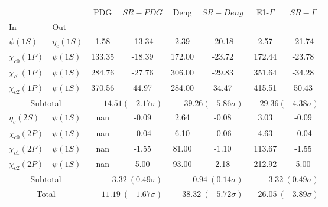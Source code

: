 \begin{tabular}{|l|l|c|c|c|c|c|c|}%
\hline%
&&PDG&$SR-PDG$&Deng&$SR-Deng$&E1-$\Gamma$&$SR-\Gamma$\\%
In&Out&&&&&&\\%
\hline%
$\psi(1S)$&$\eta_{c}(1S)$&1.58&-13.34&2.39&-20.18&2.57&-21.74\\%
$\chi_{c0}(1P)$&$\psi(1S)$&133.35&-18.39&172.00&-23.72&172.44&-23.78\\%
$\chi_{c1}(1P)$&$\psi(1S)$&284.76&-27.76&306.00&-29.83&351.64&-34.28\\%
$\chi_{c2}(1P)$&$\psi(1S)$&370.56&44.97&284.00&34.47&415.51&50.43\\%
\hline%
\hline%
\multicolumn{2}{|c|}{Subtotal}&\multicolumn{2}{|r|}{$-14.51 (-2.17\sigma)$}&\multicolumn{2}{|r|}{$-39.26 (-5.86\sigma)$}&\multicolumn{2}{|r|}{$-29.36 (-4.38\sigma)$}\\%
\hline%
\hline%
$\eta_{c}(2S)$&$\psi(1S)$&nan&-0.09&2.64&-0.08&3.03&-0.09\\%
$\chi_{c0}(2P)$&$\psi(1S)$&nan&-0.04&6.10&-0.06&4.63&-0.04\\%
$\chi_{c1}(2P)$&$\psi(1S)$&nan&-1.55&81.00&-1.10&113.67&-1.55\\%
$\chi_{c2}(2P)$&$\psi(1S)$&nan&5.00&93.00&2.18&212.92&5.00\\%
\hline%
\hline%
\multicolumn{2}{|c|}{Subtotal}&\multicolumn{2}{|r|}{$3.32~(0.49\sigma)$}&\multicolumn{2}{|r|}{$0.94~(0.14\sigma)$}&\multicolumn{2}{|r|}{$3.32~(0.49\sigma)$}\\%
\hline%
\hline%
\multicolumn{2}{|c|}{Total}&\multicolumn{2}{|r|}{$-11.19~(-1.67\sigma)$}&\multicolumn{2}{|r|}{$-38.32~(-5.72\sigma)$}&\multicolumn{2}{|r|}{$-26.05~(-3.89\sigma)$}\\%
\hline%
\end{tabular}